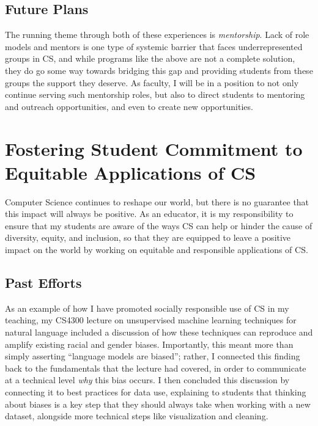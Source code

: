 \documentclass[12pt,letterpaper]{article}
\begin{document}
\subsection{Future Plans}
The running theme through both of these experiences is \emph{mentorship}.
Lack of role models and mentors is one type of systemic barrier that faces underrepresented groups in CS, and while programs like the above are not a complete solution, they do go some way towards bridging this gap and providing students from these groups the support they deserve.
As faculty, I will be in a position to not only continue serving such mentorship roles, but also to direct students to mentoring and outreach opportunities, and even to create new opportunities.
\deioutreach

\section{Fostering Student Commitment to Equitable Applications of CS}
Computer Science continues to reshape our world, but there is no guarantee that this impact will always be positive.
As an educator, it is my responsibility to ensure that my students are aware of the ways CS can help or hinder the cause of diversity, equity, and inclusion, so that they are equipped to leave a positive impact on the world by working on equitable and responsible applications of CS.

\subsection{Past Efforts}
As an example of how I have promoted socially responsible use of CS in my teaching, my CS4300 lecture on unsupervised machine learning techniques for natural language included a discussion of how these techniques can reproduce and amplify existing racial and gender biases.
Importantly, this meant more than simply asserting ``language models are biased''; rather, I connected this finding back to the fundamentals that the lecture had covered, in order to communicate at a technical level \emph{why} this bias occurs.
I then concluded this discussion by connecting it to best practices for data use, explaining to students that thinking about biases is a key step that they should always take when working with a new dataset, alongside more technical steps like visualization and cleaning.
\end{document}
